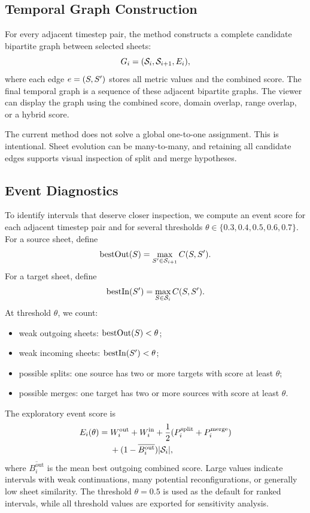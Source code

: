 \subsection{Temporal Graph Construction}

For every adjacent timestep pair, the method constructs a complete candidate
bipartite graph between selected sheets:
\[
G_i=(\mathcal{S}_i,\mathcal{S}_{i+1},E_i),
\]
where each edge \(e=(S,S')\) stores all metric values and the
combined score. The final temporal graph is a sequence of these adjacent
bipartite graphs. The viewer can display the graph using the combined score,
domain overlap, range overlap, or a hybrid score.

The current method does not solve a global one-to-one assignment. This is
intentional. Sheet evolution can be many-to-many, and retaining all candidate
edges supports visual inspection of split and merge hypotheses.

\subsection{Event Diagnostics}

To identify intervals that deserve closer inspection, we compute an event score
for each adjacent timestep pair and for several thresholds
\(\theta\in\{0.3,0.4,0.5,0.6,0.7\}\). For a source sheet, define
\[
\operatorname{bestOut}(S)=
\max_{S'\in\mathcal{S}_{i+1}}C(S,S').
\]
For a target sheet, define
\[
\operatorname{bestIn}(S')=
\max_{S\in\mathcal{S}_i}C(S,S').
\]
At threshold \(\theta\), we count:
\begin{itemize}
  \item weak outgoing sheets: \(\operatorname{bestOut}(S)<\theta\);
  \item weak incoming sheets: \(\operatorname{bestIn}(S')<\theta\);
  \item possible splits: one source has two or more targets with score
  at least \(\theta\);
  \item possible merges: one target has two or more sources with score
  at least \(\theta\).
\end{itemize}
The exploratory event score is
\[
\begin{aligned}
E_i(\theta)={}&
W^\mathrm{out}_i + W^\mathrm{in}_i
+ \frac{1}{2}(P^\mathrm{split}_i + P^\mathrm{merge}_i) \\
&+ (1-\overline{B^\mathrm{out}_i})|\mathcal{S}_i|,
\end{aligned}
\]
where \(\overline{B^\mathrm{out}_i}\) is the mean best outgoing combined score.
Large values indicate intervals with weak continuations, many potential
reconfigurations, or generally low sheet similarity. The threshold
\(\theta=0.5\) is used as the default for ranked intervals, while all threshold
values are exported for sensitivity analysis.

